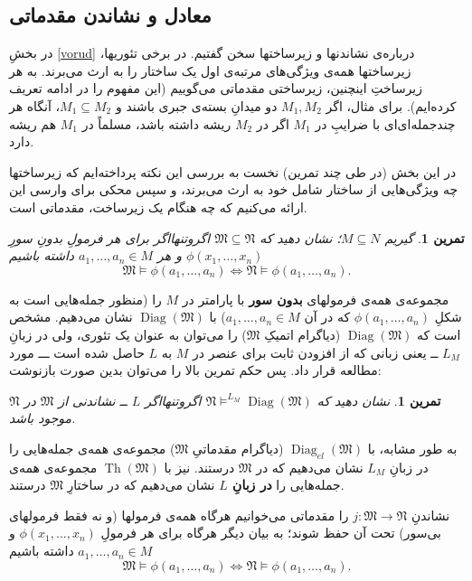\documentclass[12pt,a4paper]{article}
\theoremstyle{colorhead}
\newtheorem{tam}[thm]{تمرین}
\DeclareMathOperator{\Th}{Th}
\DeclareMathOperator{\diag}{Diag}
\begin{document}
\subsection{	معادل و نشاندن مقدماتی}
در بخشِ
\ref{vorud}
درباره‌ی نشاندنها و زیرساختها سخن گفتیم. در برخی تئوریها، زیرساختها همه‌ی ویژگی‌های مرتبه‌ی اول یک ساختار را به ارث می‌برند. به هر زیرساختِ اینچنین، زیرساختی مقدماتی می‌گوییم (این مفهوم را در ادامه تعریف کرده‌ایم).
برای مثال، اگر
$M_1,M_2$
دو میدانِ بسته‌ی جبری باشند و 
$M_1\subseteq M_2$،
آنگاه هر چندجمله‌ای‌ای با ضرایبِ در
$M_1$
اگر در
$M_2$
ریشه داشته باشد، مسلماً در
$M_1$
هم ریشه دارد. 
\par 
در این بخش  (در طی چند تمرین) نخست به بررسی این نکته پرداخته‌ایم که زیرساختها چه ويژگی‌هایی از
 ساختار شامل خود 
به ارث می‌برند،‌ و سپس محکی برای وارسی این ارائه می‌کنیم  که 
چه هنگام یک زیرساخت، مقدماتی است.
\begin{tam}
گیریم
$M\subseteq N$؛
نشان دهید که
$\mathfrak{M}\subseteq \mathfrak{N}$
اگروتنهااگر برای هر فرمولِ
بدونِ سورِ
$\phi(x_1,\ldots,x_n)$
و هر
$a_1,\ldots, a_n\in M$
داشته باشیم
\[
\mathfrak{M}\models \phi(a_1,\ldots,a_n)\Leftrightarrow\mathfrak{N}\models \phi(a_1,\ldots,a_n).
\]
\end{tam}
مجموعه‌ی همه‌ی فرمولهای \textbf{بدون سور} با پارامتر در
$M$
را 
(منظور جمله‌هایی است به شکلِ
$\phi(a_1,\ldots,a_n)$
که در آن
$a_1,\ldots,a_n\in M$)
با
$\diag(\mathfrak{M})$
نشان می‌دهیم. مشخص است که
$\diag(\mathfrak{M})$
(دیاگرام اتمیکِ
$\mathfrak{M}$)
را می‌توان به عنوان یک تئوری، ولی در زبانِ
$L_M$ ــ
یعنی زبانی که از افزودن ثابت برای عنصر در
$M$
به
$L$ 
حاصل شده است ـــ
 مورد مطالعه قرار داد.
پس حکم تمرین بالا را می‌توان بدین صورت بازنوشت:
\begin{tam}
نشان دهید که
$\mathfrak{N}\models^{L_M} \diag(\mathfrak{M})$
اگروتنهااگر 
$L$ ــ
نشاندنی از 
$\mathfrak{M}$
در
$\mathfrak{N}$
موجود باشد.
\end{tam}
\par 
به طور مشابه،‌ با
$\diag_{el}(\mathfrak{M})$
(دیاگرام مقدماتیِ
$\mathfrak{M}$)
مجموعه‌ی همه‌ی جمله‌هایی را در زبانِ
$L_M$
نشان می‌دهیم که در
$\mathfrak{M}$
درستند. 
نیز با
$\Th(\mathfrak{M})$
مجموعه‌ی همه‌ی جمله‌هایی را 
\textbf{در زبانِ
$L$}
نشان می‌دهیم که در ساختارِ
$\mathfrak{M}$
درستند. 
\par 
نشاندنِ
$j:\mathfrak{M}\to \mathfrak{N}$
را مقدماتی می‌خوانیم هرگاه همه‌ی فرمولها (و نه فقط فرمولهای بی‌سور) تحت آن حفظ شوند؛ به بیان دیگر هرگاه
برای هر فرمولِ
$\phi(x_1,\ldots,x_n)$
و
$a_1,\ldots,a_n\in M$
داشته باشیم
\[
\mathfrak{M}\models \phi(a_1,\ldots,a_n)\Leftrightarrow\mathfrak{N}\models
\phi(a_1,\ldots,a_n).
\]
\end{document}
